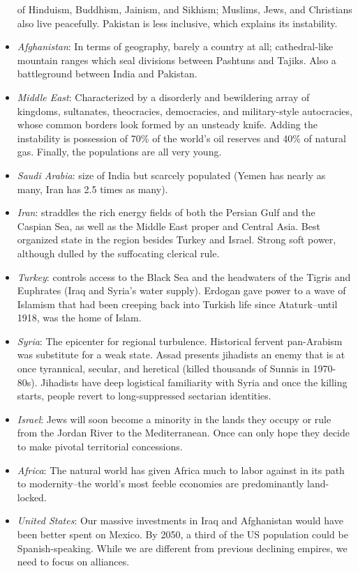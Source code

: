 \documentclass[
]{article}
\begin{document}
\begin{itemize}
  of Hinduism, Buddhism, Jainism, and Sikhism; Muslims, Jews, and
  Christians also live peacefully. Pakistan is less inclusive, which
  explains its instability.
\item
  \emph{Afghanistan}: In terms of geography, barely a country at all;
  cathedral-like mountain ranges which seal divisions between Pashtuns
  and Tajiks. Also a battleground between India and Pakistan.
\item
  \emph{Middle East}: Characterized by a disorderly and bewildering
  array of kingdoms, sultanates, theocracies, democracies, and
  military-style autocracies, whose common borders look formed by an
  unsteady knife. Adding the instability is possession of 70\% of the
  world's oil reserves and 40\% of natural gas. Finally, the populations
  are all very young.
\item
  \emph{Saudi Arabia}: size of India but scarcely populated (Yemen has
  nearly as many, Iran has 2.5 times as many).
\item
  \emph{Iran}: straddles the rich energy fields of both the Persian Gulf
  and the Caspian Sea, as well as the Middle East proper and Central
  Asia. Best organized state in the region besides Turkey and Israel.
  Strong soft power, although dulled by the suffocating clerical rule.
\item
  \emph{Turkey}: controls access to the Black Sea and the headwaters of
  the Tigris and Euphrates (Iraq and Syria's water supply). Erdogan gave
  power to a wave of Islamism that had been creeping back into Turkish
  life since Ataturk--until 1918, was the home of Islam.
\item
  \emph{Syria}: The epicenter for regional turbulence. Historical
  fervent pan-Arabism was substitute for a weak state. Assad presents
  jihadists an enemy that is at once tyrannical, secular, and heretical
  (killed thousands of Sunnis in 1970-80s). Jihadists have deep
  logistical familiarity with Syria and once the killing starts, people
  revert to long-suppressed sectarian identities.
\item
  \emph{Israel}: Jews will soon become a minority in the lands they
  occupy or rule from the Jordan River to the Mediterranean. Once can
  only hope they decide to make pivotal territorial concessions.
\item
  \emph{Africa}: The natural world has given Africa much to labor
  against in its path to modernity--the world's most feeble economies
  are predominantly land-locked.
\item
  \emph{United States}: Our massive investments in Iraq and Afghanistan
  would have been better spent on Mexico. By 2050, a third of the US
  population could be Spanish-speaking. While we are different from
  previous declining empires, we need to focus on alliances.
\end{itemize}
\end{document}
